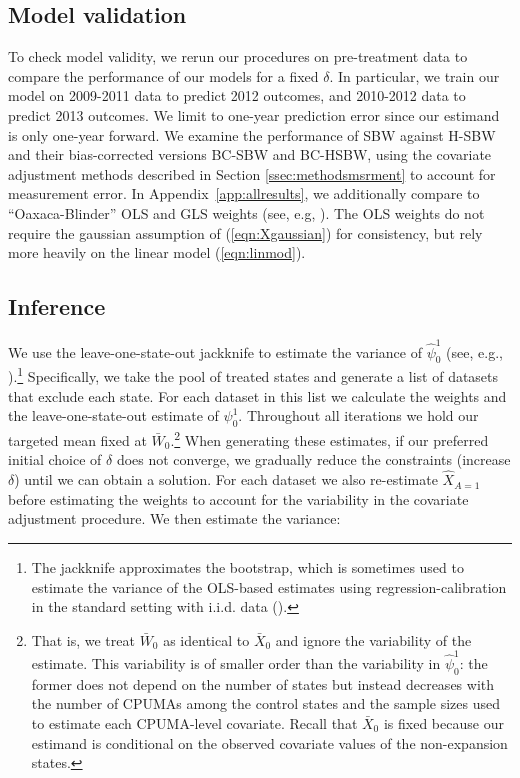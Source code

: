\documentclass[aoas]{imsart}
\theoremstyle{plain}
\theoremstyle{remark}
\begin{document}
\subsection{Model validation}

To check model validity, we rerun our procedures on pre-treatment data to compare the performance of our models for a fixed $\delta$. In particular, we train our model on 2009-2011 data to predict 2012 outcomes, and 2010-2012 data to predict 2013 outcomes. We limit to one-year prediction error since our estimand is only one-year forward. We examine the performance of SBW against H-SBW and their bias-corrected versions BC-SBW and BC-HSBW, using the covariate adjustment methods described in Section \ref{ssec:methodsmsrment} to account for measurement error. In Appendix~\ref{app:allresults}, we additionally compare to ``Oaxaca-Blinder'' OLS and GLS weights (see, e.g, \cite{kline2011oaxaca}). The OLS weights do not require the gaussian assumption of (\ref{eqn:Xgaussian}) for consistency, but rely more heavily on the linear model (\ref{eqn:linmod}).

\subsection{Inference}

We use the leave-one-state-out jackknife to estimate the variance of $\hat{\psi}_0^1$ (see, e.g., \cite{cameron2015practitioner}).\footnote{The jackknife approximates the bootstrap, which is sometimes used to estimate the variance of the OLS-based estimates using regression-calibration in the standard setting with i.i.d. data (\cite{carroll2006measurement}).} Specifically, we take the pool of treated states and generate a list of datasets that exclude each state. For each dataset in this list we calculate the weights and the leave-one-state-out estimate of $\psi_0^1$. Throughout all iterations we hold our targeted mean fixed at $\bar{W}_0$.\footnote{That is, we treat $\bar{W}_0$ as identical to $\bar{X}_0$ and ignore the variability of the estimate. This variability is of smaller order than the variability in $\hat{\psi}_0^1$: the former does not depend on the number of states but instead decreases with the number of CPUMAs among the control states and the sample sizes used to estimate each CPUMA-level covariate. Recall that $\bar{X}_0$ is fixed because our estimand is conditional on the observed covariate values of the non-expansion states.} When generating these estimates, if our preferred initial choice of $\delta$ does not converge, we gradually reduce the constraints (increase $\delta$) until we can obtain a solution. For each dataset we also re-estimate $\hat{X}_{A=1}$ before estimating the weights to account for the variability in the covariate adjustment procedure. We then estimate the variance:
\end{document}
